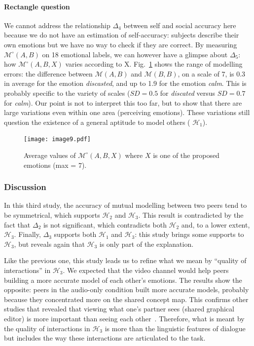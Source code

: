 \documentclass[natbib]{svjour3}
\newcommand{\gmodel}[2]{{$\mathcal{M}(#1, #2)$}}
\newcommand{\Model}[3]{{$\mathcal{M}^{\circ}(#1, #2, #3)$}}
\newcommand{\gModel}[2]{{$\mathcal{M}^{\circ}(#1, #2)$}}
\begin{document}
\paragraph{Rectangle question} We cannot address the relationship $\Delta_4$
between self and social accuracy here because we do not have an estimation of
self-accuracy: subjects describe their own emotions but we have no way to check if
they are correct. By measuring \gModel{A}{B} on  18 emotional labels,
we can however have a glimpse about $\Delta_5$: how \Model{A}{B}{X} varies
according to X.  Fig.~\ref{study3:deg_m_values} shows the range of modelling
errors: the difference between \gmodel{A}{B} and \gmodel{B}{B}, on a scale of 7,
is 0.3 in average for the emotion \emph{discasted}, and up to 1.9 for the
emotion \emph{calm}. This is probably specific to the variety of scales  ($SD=
0.5$ for \emph{discated} versus $SD=0.7$ for \emph{calm}). Our point is not to
interpret this too far, but to show that there are large variations even within one
area  (perceiving emotions). These variations still question the existence of
a general aptitude to model others ( $\mathcal{H}_{1}$).

\begin{figure}[ht!]
        \centering
        \texttt{[image: image9.pdf]}
        \caption{Average values of \Model{A}{B}{X} where $X$ is one of the proposed
        emotions (max = 7).}
        \label{study3:deg_m_values}
\end{figure}



\subsubsection*{Discussion} 

In this third study, the accuracy of mutual modelling  between two peers tend to
be symmetrical, which  supports $\mathcal{H}_{2}$ and $\mathcal{H}_{3}$. This
result is contradicted by the fact that $\Delta_2$ is not significant, which
contradicts both $\mathcal{H}_{2}$ and, to a lower extent, $\mathcal{H}_{3}$.
Finally, $\Delta_3$ supports both $\mathcal{H}_{1}$ and  $\mathcal{H}_{3}$: this
study brings some supports to  $\mathcal{H}_{3}$, but reveals again that
$\mathcal{H}_{3}$ is only part of the explanation.

Like the previous one, this study leads us to refine what we mean by ``quality
of interactions'' in $\mathcal{H}_{3}$. We  expected that the video channel
would help peers building a more accurate model of each other's emotions. The
results show the opposite: peers in the audio-only condition built more accurate
models, probably because they concentrated more on the shared concept map. This
confirms other studies that revealed that viewing what one's partner sees
(shared graphical editor) is more important than seeing each
other~\citep{gaver1993one,anderson1997impact}. Therefore, what is meant by the
quality of interactions in $\mathcal{H}_{3}$ is more than the linguistic
features of dialogue but includes the way these interactions are articulated to
the task.
\end{document}

